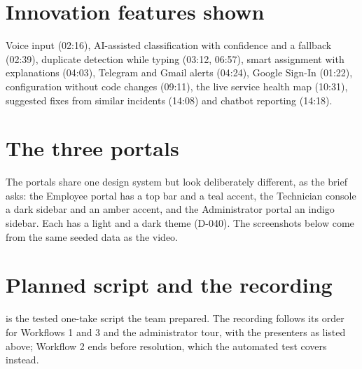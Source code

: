 \section{Innovation features shown}
Voice input (02:16), AI-assisted classification with confidence and a fallback (02:39), duplicate
detection while typing (03:12, 06:57), smart assignment with explanations (04:03), Telegram and
Gmail alerts (04:24), Google Sign-In (01:22), configuration without code changes (09:11), the live
service health map (10:31), suggested fixes from similar incidents (14:08) and chatbot reporting
(14:18).

\section{The three portals}
The portals share one design system but look deliberately different, as the brief asks: the
Employee portal has a top bar and a teal accent, the Technician console a dark sidebar and an
amber accent, and the Administrator portal an indigo sidebar. Each has a light and a dark theme
(D-040). The screenshots below come from the same seeded data as the video.








\section{Planned script and the recording}
 is the tested one-take script the team prepared. The recording
follows its order for Workflows 1 and 3 and the administrator tour, with the presenters as listed
above; Workflow 2 ends before resolution, which the automated test covers instead.
